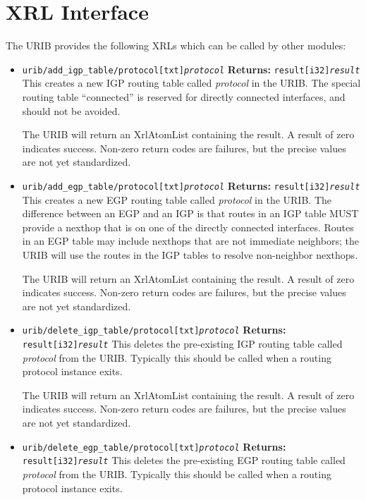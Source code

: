 \documentclass[11pt]{article}
\begin{document}
\section{XRL Interface}
The URIB provides the following XRLs which can be called by other modules:
\begin{itemize}
\item 
{\tt urib/add\_igp\_table/protocol[txt]{\it protocol}}
\newline
{\bf Returns:} {\tt result[i32]{\it result}}
\newline
This creates a new IGP routing table called {\it protocol} in the
URIB.  The special routing table ``connected'' is reserved for
directly connected interfaces, and should not be avoided.

The URIB will return an XrlAtomList containing the result.  A result
of zero indicates success.  Non-zero return codes are failures, but
the precise values are not yet standardized.

\item 
{\tt urib/add\_egp\_table/protocol[txt]{\it protocol}}
\newline
{\bf Returns:} {\tt result[i32]{\it result}}
\newline
This creates a new EGP routing table called {\it protocol} in the
URIB. The difference between an EGP and an IGP is that routes in an
IGP table MUST provide a nexthop that is on one of the directly
connected interfaces.  Routes in an EGP table may include nexthops
that are not immediate neighbors; the URIB will use the routes in the
IGP tables to resolve non-neighbor nexthops.

The URIB will return an XrlAtomList containing the result.  A result
of zero indicates success.  Non-zero return codes are failures, but
the precise values are not yet standardized.

\item 
{\tt urib/delete\_igp\_table/protocol[txt]{\it protocol}}
\newline
{\bf Returns:} {\tt result[i32]{\it result}}
\newline
This deletes the pre-existing IGP routing table called {\it protocol}
from the URIB.  Typically this should be called when a routing
protocol instance exits.

The URIB will return an XrlAtomList containing the result.  A result
of zero indicates success.  Non-zero return codes are failures, but
the precise values are not yet standardized.

\item 
{\tt urib/delete\_egp\_table/protocol[txt]{\it protocol}}
\newline
{\bf Returns:} {\tt result[i32]{\it result}}
\newline
This deletes the pre-existing EGP routing table called {\it protocol}
from the URIB.  Typically this should be called when a routing
protocol instance exits.


\end{itemize}
\end{document}
